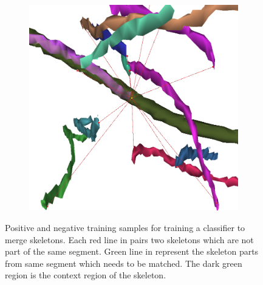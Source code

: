 \begin{figure}[htpb]
\begin{subfigure}[b]{0.3\textwidth}
		\includegraphics[width=\textwidth]{data/images/matchingData/negative_2.png}
		\caption{\label{fig:negativeMatch}}
	\end{subfigure}
	\caption{Positive  and negative  training samples for training a classifier to merge skeletons. Each red line in  pairs two skeletons which are not part of the same segment. Green line in  represent the skeleton parts from same segment which needs to be matched. The dark green region is the context region of the skeleton.}
	\label{fig:skelMatchTrainData}
\end{figure}

